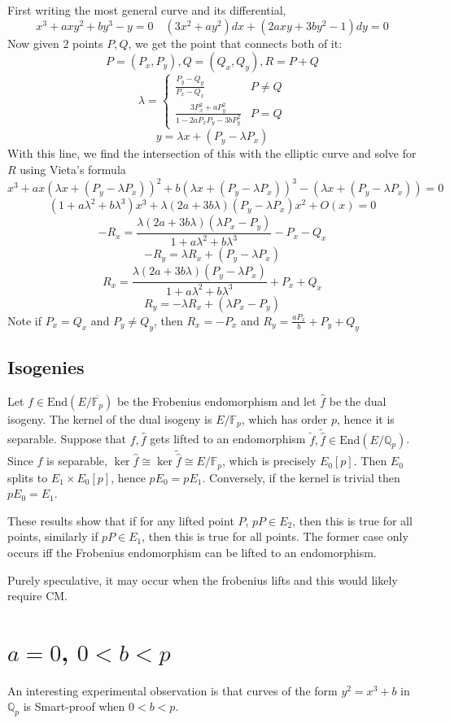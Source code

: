 \documentclass{article}
\newcommand{\End}[1]
{\text{End}\left(#1\right)}
\newcommand{\mb}
{\mathbb}
\begin{document}
First writing the most general curve and its differential,
$$x^3+axy^2+by^3-y=0\quad \left(3x^2+ay^2\right)dx+\left(2axy+3by^2-1\right)dy=0$$
Now given $2$ points $P,Q$, we get the point that connects both of it:
$$P=\left(P_x,P_y\right),Q=\left(Q_x,Q_y\right),R=P+Q$$
$$\lambda=\begin{cases}\frac{P_y-Q_y}{P_x-Q_x}&P\neq Q\\\frac{3P_x^2+aP_y^2}{1-2aP_xP_y-3bP_y^2}&P=Q\end{cases}$$
$$y=\lambda x+\left(P_y-\lambda P_x\right)$$
With this line, we find the intersection of this with the elliptic curve and solve for $R$ using Vieta's formula
$$x^3+ax\left(\lambda x+\left(P_y-\lambda P_x\right)\right)^2+b\left(\lambda x+\left(P_y-\lambda P_x\right)\right)^3-\left(\lambda x+\left(P_y-\lambda P_x\right)\right)=0$$
$$\left(1+a\lambda^2+b\lambda^3\right)x^3 + \lambda\left(2a+3b\lambda\right)\left(P_y-\lambda P_x\right)x^2 + O(x) = 0$$
$$-R_x=\frac{\lambda\left(2a+3b\lambda\right)\left(\lambda P_x-P_y\right)}{1+a\lambda^2+b\lambda^3}-P_x-Q_x$$
$$-R_y=\lambda R_x+\left(P_y-\lambda P_x\right)$$
$$R_x=\frac{\lambda\left(2a+3b\lambda\right)\left(P_y-\lambda P_x\right)}{1+a\lambda^2+b\lambda^3}+P_x+Q_x$$
$$R_y=-\lambda R_x+\left(\lambda P_x-P_y\right)$$
Note if $P_x=Q_x$ and $P_y\neq Q_y$, then $R_x=-P_x$ and $R_y=\frac{aP_x}{b}+P_y+Q_y$

\subsection{Isogenies}

Let $f\in\End{E/\overline{\mb F_p}}$ be the Frobenius endomorphism and let $\hat f$ be the dual isogeny. The kernel of the dual isogeny is $E/\mb F_p$, which has order $p$, hence it is separable. Suppose that $f,\hat f$ gets lifted to an endomorphism $\tilde f,\tilde{\hat f}\in\End{E/\mb Q_p}$. Since $\hat f$ is separable, $\ker\hat f\cong\ker\tilde{\hat f}\cong E/\mb F_p$, which is precisely $E_0[p]$. Then $E_0$ splits to $E_1\times E_0[p]$, hence $pE_0=pE_1$. Conversely, if the kernel is trivial then $pE_0=E_1$.

These results show that if for any lifted point $P$, $pP\in E_2$, then this is true for all points, similarly if $pP\in E_1$, then this is true for all points. The former case only occurs iff the Frobenius endomorphism can be lifted to an endomorphism.

Purely speculative, it may occur when the frobenius lifts and this would likely require CM. 

\section{$a=0$, $0<b<p$}

An interesting experimental observation is that curves of the form $y^2=x^3+b$ in $\mathbb Q_p$ is Smart-proof when $0<b<p$.
\fi



 	
\end{document}
